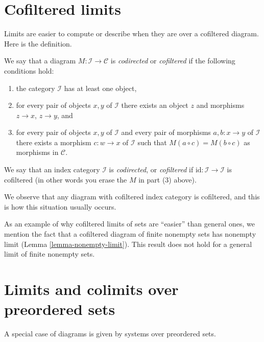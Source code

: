 \section{Cofiltered limits}
\label{section-codirected-limits}

\noindent
Limits are easier to compute or describe when they
are over a cofiltered diagram. Here is the definition.

\begin{definition}
\label{definition-codirected}
We say that a diagram $M : \mathcal{I} \to \mathcal{C}$ is {\it codirected}
or {\it cofiltered} if the following conditions hold:
\begin{enumerate}
\item the category $\mathcal{I}$ has at least one object,
\item for every pair of objects $x, y$ of $\mathcal{I}$
there exists an object $z$ and morphisms $z \to x$,
$z \to y$, and
\item for every pair of objects $x, y$ of $\mathcal{I}$
and every pair of morphisms $a, b : x \to y$ of $\mathcal{I}$
there exists a morphism $c : w \to x$ of $\mathcal{I}$
such that $M(a \circ c) = M(b \circ c)$ as morphisms in $\mathcal{C}$.
\end{enumerate}
We say that an index category $\mathcal{I}$ is {\it codirected}, or
{\it cofiltered} if $\text{id} : \mathcal{I} \to \mathcal{I}$ is
cofiltered (in other words you erase the $M$ in part (3) above).
\end{definition}

\noindent
We observe that any diagram with cofiltered index category is cofiltered,
and this is how this situation usually occurs.

\medskip\noindent
As an example of why cofiltered limits of sets are ``easier'' than
general ones, we mention the fact that a cofiltered diagram of finite
nonempty sets has nonempty limit (Lemma \ref{lemma-nonempty-limit}).
This result does not hold for a general limit of finite
nonempty sets.












\section{Limits and colimits over preordered sets}
\label{section-posets-limits}

\noindent
A special case of diagrams is given by systems over preordered sets.

